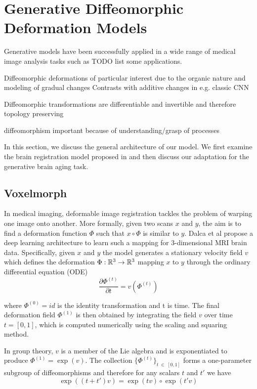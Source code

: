 \chapter{Generative Diffeomorphic Deformation Models}
Generative models have been successfully applied in a wide range of medical image analysis tasks such as TODO list some applications. 

Diffeomorphic deformations of particular interest due to the organic nature and modeling of gradual changes
Contrasts with additive changes in e.g. classic CNN

Diffeomorphic transformations are differentiable and invertible and therefore topology preserving

diffeomorphism important because of understanding/grasp of processes


In this section, we discuss the general architecture of our model. We first examine the brain registration model proposed in \cite{voxelmorph} and then discuss our adaptation for the generative brain aging task.

\section{Voxelmorph}
\label{chap:voxelmorph}
In medical imaging, deformable image registration tackles the problem of warping one image onto another. More formally, given two scans $x$ and $y$, the aim is to find a deformation function $\Phi$ such that $x \circ \Phi$ is similar to $y$.
Dalca et al propose a deep learning architecture to learn such a mapping for 3-dimensional MRI brain data. Specifically, given $x$ and $y$ the model generates a stationary velocity field $v$ which defines the deformation ${\Phi : \mathbb{R}^3 \rightarrow \mathbb{R}^3}$ mapping $x$ to $y$ through the ordinary differential equation (ODE)
\begin{equation} \label{eq:voxODE}
	\frac{\partial \Phi^{(t)}}{\partial t} = v(\Phi^{(t)})
\end{equation}

where $\Phi^{(0)} = id$ is the identity transformation and t is time.
The final deformation field $\Phi^{(1)}$ is then obtained by integrating the field $v$ over time $t = [0, 1]$, which is computed numerically using the scaling and squaring method.

In group theory, $v$ is a member of the Lie algebra and is exponentiated to produce $\Phi^{(1)} = \exp(v)$.
The collection $\{\Phi^{(t)}\}_{t \; \in \; [0,1]}$ forms a one-parameter subgroup of diffeomorphisms and therefore for any scalars $t$ and $t'$ we have 
\begin{equation} \label{eq:voxoneparamsubgroup}
	\exp((t + t')v) = \exp(tv) \circ \exp(t'v)
\end{equation}

